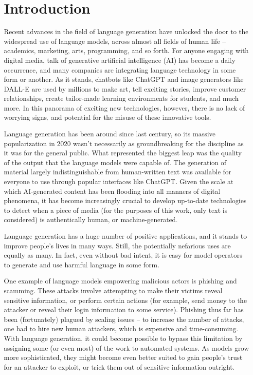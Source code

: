 \section{Introduction}
\label{sec:introduction}

Recent advances in the field of language generation have unlocked the door to the widespread use of language models, across almost all fields of human life -- academics, marketing, arts, programming, and so forth.
For anyone engaging with digital media, talk of generative artificial intelligence (AI) has become a daily occurrence, and many companies are integrating language technology in some form or another.
As it stands, chatbots like ChatGPT and image generators like DALL-E are used by millions to make art, tell exciting stories, improve customer relationships, create tailor-made learning environments for students, and much more.
In this panorama of exciting new technologies, however, there is no lack of worrying signs, and potential for the misuse of these innovative tools.

Language generation has been around since last century, so its massive popularization in 2020 wasn't necessarily as groundbreaking for the discipline as it was for the general public.
What represented the biggest leap was the quality of the output that the language models were capable of.
The generation of material largely indistinguishable from human-written text was available for everyone to use through popular interfaces like ChatGPT.
Given the scale at which AI-generated content has been flooding into all manners of digital phenomena, it has become increasingly crucial to develop up-to-date technologies to detect when a piece of media (for the purposes of this work, only text is considered) is authentically human, or machine-generated.

Language generation has a huge number of positive applications, and it stands to improve people's lives in many ways. Still, the potentially nefarious uses are equally as many.
In fact, even without bad intent, it is easy for model operators to generate and use harmful language in some form.

One example of language models empowering malicious actors is phishing and scamming.
These attacks involve attempting to make their victims reveal sensitive information, or perform certain actions (for example, send money to the attacker or reveal their login information to some service).
Phishing thus far has been (fortunately) plagued by scaling issues -- to increase the number of attacks, one had to hire new human attackers, which is expensive and time-consuming.
With language generation, it could become possible to bypass this limitation by assigning some (or even most) of the work to automated systems.
As models grow more sophisticated, they might become even better suited to gain people's trust for an attacker to exploit, or trick them out of sensitive information outright.

